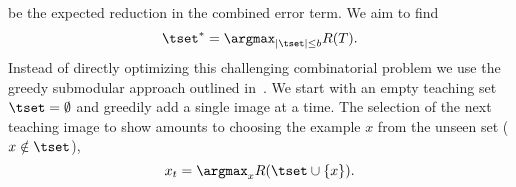 \documentclass[../main.tex]{subfiles}
\begin{document}
be the expected reduction in the combined error term. We aim to find
\begin{align}
  \tset^* = \argmax_{|\tset| \leq b} R(T).
  \label{eqn:problem}
\end{align}
Instead of directly optimizing this challenging combinatorial problem we use the greedy submodular approach outlined in~\cite{singla2014near}. 
We start with an empty teaching set $\tset=\emptyset$ and greedily add a single image at a time.
The selection of the next teaching image to show amounts to choosing the example $x$ from the unseen set ($x\notin \tset$),
\begin{equation}
  x_{t} = \argmax_{x} R(\tset \cup \{x\}).
  \label{eqn:final_selection}
\end{equation}
\end{document}
